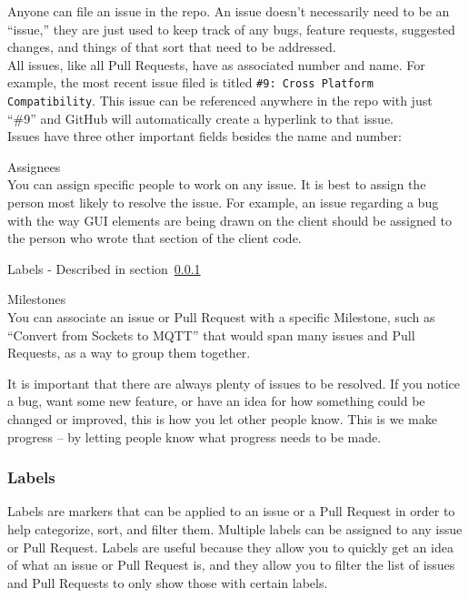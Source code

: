\documentclass{article}
\begin{document}
Anyone can file an issue in the repo. An issue doesn't necessarily need to be an ``issue,'' they are just used to keep track of
any bugs, feature requests, suggested changes, and things of that sort that need to be addressed.
\\

\noindent
All issues, like all Pull Requests, have as associated number and name. For example, the most recent issue filed is titled \texttt{\#9:~Cross Platform Compatibility}. This issue can be referenced anywhere in the repo with just ``\#9'' and GitHub will automatically create a hyperlink to that issue.
\\

\noindent
Issues have three other important fields besides the name and number:
\begin{description}
	\item Assignees
		\\You can assign specific people to work on any issue. It is best to assign the person most likely to resolve the issue. For example, an issue regarding a bug with the way GUI elements are being drawn on the client should be assigned to the person who wrote that section of the client code.
	\item Labels - Described in section~\ref{Labels}
	\item Milestones
		\\You can associate an issue or Pull Request with a specific Milestone, such as ``Convert from Sockets to MQTT'' that would span many issues and Pull Requests, as a way to group them together.
\end{description}

\noindent
It is important that there are always plenty of issues to be resolved.
If you notice a bug, want some new feature, or have an idea for how something could be changed or improved, this is how you let other people know. This is we make progress -- by letting people know what progress needs to be made.

\subsubsection{Labels} \label{Labels}

Labels are markers that can be applied to an issue or a Pull Request in order to help categorize, sort, and filter them.
Multiple labels can be assigned to any issue or Pull Request.
Labels are useful because they allow you to quickly get an idea of what an issue or Pull Request is, and they allow you to filter the list of issues and Pull Requests to only show those with certain labels.
\\
\end{document}
